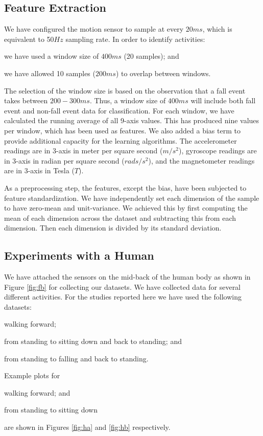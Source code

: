 \documentclass[letterpaper]{article}
\begin{document}
\begin{sloppy}
\subsection{Feature Extraction}

We  have configured the motion sensor to sample at every  $20ms$, which is equivalent to 50$Hz$ 
sampling rate. In order to 
identify activities: \begin{inparaenum}[1)] \item we have used a window size of $400ms$ (20 
samples); and \item we have allowed 10 samples ($200ms$) to overlap between windows. 
\end{inparaenum} The selection of the window size is based on the observation that a fall event 
takes between $200-300ms$. Thus, a window size of $400ms$ will include both fall event and 
non-fall event data for classification. For each window, we have calculated the running average of 
all 9-axis values. This has produced nine values per window, which has been used as features. We 
also added a bias term to provide additional capacity for the learning algorithms. The  
accelerometer readings are in 3-axis in meter per square second ($m/s^2$), gyroscope readings are 
in 3-axis in radian per square second ($rads/s^2$), and the magnetometer readings are in 3-axis in 
Tesla ($T$). 

As a preprocessing step, the features, except the bias, have been subjected to feature 
standardization. We have independently set each dimension of the sample  to have zero-mean and 
unit-variance. We achieved this by first computing the mean of each dimension across the dataset and 
subtracting this from each dimension. Then each dimension is divided by its standard deviation.
 

\subsection{Experiments with a Human}

We have attached the sensors on the mid-back of the human body as shown in Figure \ref{fig:fb} for  
collecting our datasets. We have collected data for several different  activities. For the studies 
reported here we have used the following datasets:
\begin{inparaenum}[(1)] \item walking forward; \item from standing to sitting down 
and back to standing; and \item from standing to falling and back to standing. \end{inparaenum} 
Example plots for \begin{inparaenum}[1)] \item walking forward; and \item from standing to sitting 
down  \end{inparaenum}  are shown in Figures \ref{fig:ha} and \ref{fig:hb} respectively. 


\end{sloppy}
\end{document}
